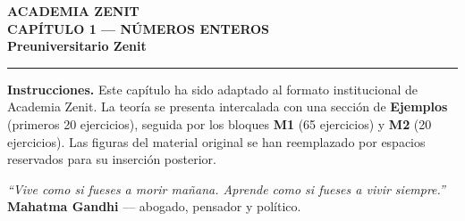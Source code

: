 \documentclass[11pt,letterpaper]{article}
\begin{document}
\captionsetup{singlelinecheck=false}

\begin{center}
  {\Huge\bfseries\color{zenitnavy} ACADEMIA ZENIT}\\[4pt]
  {\LARGE\bfseries\color{zenitblue} CAPÍTULO 1 — NÚMEROS ENTEROS}\\[6pt]
  {\large\bfseries\color{zenitnavy} Preuniversitario Zenit}\\[8pt]
  \rule{\linewidth}{1pt}
\end{center}

\begin{tcolorbox}[instrbox]
\textbf{Instrucciones.} Este capítulo ha sido adaptado al formato institucional de Academia Zenit. La teoría se presenta intercalada con una sección de \textbf{Ejemplos} (primeros 20 ejercicios), seguida por los bloques \textbf{M1} (65 ejercicios) y \textbf{M2} (20 ejercicios). Las figuras del material original se han reemplazado por espacios reservados para su inserción posterior.
\end{tcolorbox}

\begin{center}
\textit{``Vive como si fueses a morir mañana. Aprende como si fueses a vivir siempre.''}\\
\textbf{Mahatma Gandhi} --- abogado, pensador y político.
\end{center}
\end{document}
